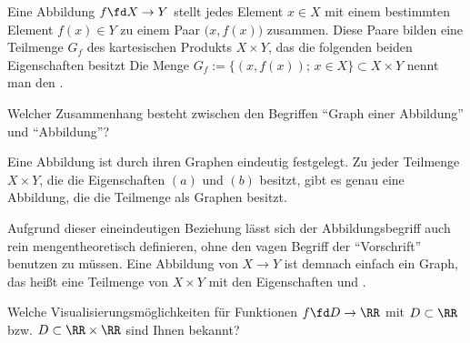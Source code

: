 \begin{antwort}
  Eine Abbildung $f\fd X\to Y$ stellt jedes Element $x\in X$ mit 
  einem bestimmten Element $f(x)\in Y$ zu einem Paar $\big(x,f(x)\big)$ 
  zusammen. Diese Paare bilden eine Teilmenge 
  $G_f$ 
  des kartesischen Produkts $X\times Y$, 
  das die folgenden beiden Eigenschaften besitzt 
  \noindent
  Die Menge $G_f:=\{ (x,f(x));\, x\in X \}\subset X\times Y$ 
  nennt man den . \AntEnd
\end{antwort} 

\begin{frage}
  Welcher Zusammenhang besteht zwischen den Begriffen 
  "`Graph einer Abbildung"' und "`Abbildung"'?
\end{frage}

\begin{antwort}
  Eine Abbildung ist durch ihren Graphen eindeutig festgelegt. 
  Zu jeder Teilmenge $X\times Y$, die 
  die Eigenschaften $(a)$ und $(b)$ besitzt, gibt es genau eine Abbildung, 
  die die Teilmenge als Graphen besitzt. 

  Aufgrund dieser eineindeutigen Beziehung lässt sich der Abbildungsbegriff 
  auch rein mengentheoretisch definieren, ohne den vagen Begriff 
  der "`Vorschrift"' 
  benutzen zu müssen. Eine Abbildung von $X\to Y$ ist demnach einfach ein 
  Graph, das heißt eine Teilmenge von $X\times Y$ mit den 
  Eigenschaften  und .
  \AntEnd
\end{antwort}

\begin{frage}
  Welche Visualisierungsmöglichkeiten für Funktionen $f\fd D \to \RR$ 
  mit $D\subset\RR$ bzw. $D\subset\RR\times\RR$ sind Ihnen bekannt?
\end{frage}

